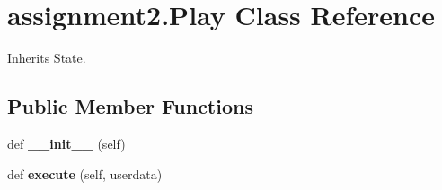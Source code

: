 \section{assignment2.\+Play Class Reference}
\label{classassignment2_1_1_play}


Inherits State.

\subsection*{Public Member Functions}
\begin{DoxyCompactItemize}
\item 
def \textbf{ \+\_\+\+\_\+init\+\_\+\+\_\+} (self)
\item 
def \textbf{ execute} (self, userdata)
\end{DoxyCompactItemize}
